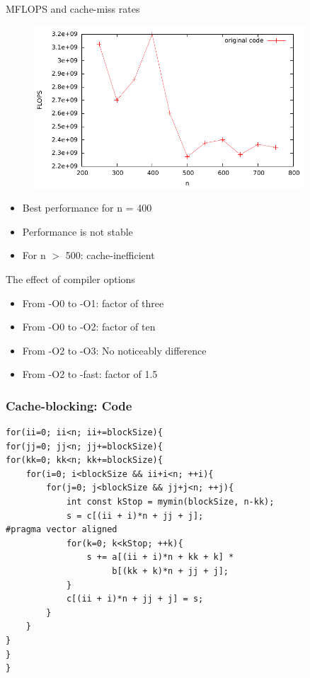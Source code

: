 \begin{frame}{MFLOPS and cache-miss rates}
\begin{figure}[h]
  \begin{center}
    \includegraphics[width=0.9\textwidth]{../graphics/graph_unblocked.pdf}
  \end{center}
\end{figure}
\begin{itemize}
\item Best performance for n = 400
\item Performance is not stable
\item For n $>$ 500: cache-inefficient
\end{itemize}
\end{frame}

\begin{frame}{The effect of compiler options}
\begin{itemize}
\item From -O0 to -O1: factor of three
\item From -O0 to -O2: factor of ten
\item From -O2 to -O3: No noticeably difference
\item From -O2 to -fast: factor of 1.5
\end{itemize}
\end{frame}

\begin{frame}[fragile]
\frametitle{Cache-blocking: Code}
\codestylec
\begin{lstlisting}
for(ii=0; ii<n; ii+=blockSize){
for(jj=0; jj<n; jj+=blockSize){
for(kk=0; kk<n; kk+=blockSize){
    for(i=0; i<blockSize && ii+i<n; ++i){
        for(j=0; j<blockSize && jj+j<n; ++j){
            int const kStop = mymin(blockSize, n-kk);
            s = c[(ii + i)*n + jj + j];
#pragma vector aligned
            for(k=0; k<kStop; ++k){
                s += a[(ii + i)*n + kk + k] * 
                     b[(kk + k)*n + jj + j];
            }
            c[(ii + i)*n + jj + j] = s;
        }
    }
}
}
}
\end{lstlisting}
\end{frame}

